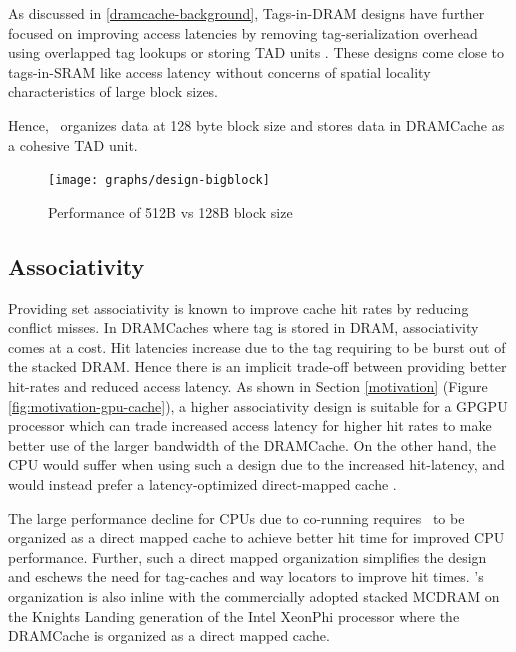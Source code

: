 \par As discussed in \ref{dramcache-background}, Tags-in-DRAM designs have further focused on improving access latencies by removing tag-serialization overhead using overlapped tag lookups \cite{loh-hill} or storing TAD units \cite{alloy}. These designs come close to tags-in-SRAM like access latency without concerns of spatial locality characteristics of large block sizes. 
\par Hence, \cachename\ organizes data at 128 byte block size and stores data in DRAMCache as a cohesive TAD unit.

\begin{figure}[htbp]
   \centering
   \texttt{[image: graphs/design-bigblock]}
   \caption{Performance of 512B vs 128B block size}	
   \label{fig:design-bigblock}
\end{figure}

\subsection{Associativity} 
Providing set associativity is known to improve cache hit rates by reducing conflict misses. In DRAMCaches where tag is stored in DRAM,  associativity comes at a cost. Hit latencies increase due to the tag requiring to be burst out of the stacked DRAM. Hence there is an implicit trade-off between providing better hit-rates and reduced access latency. As shown in Section \ref{motivation} (Figure \ref{fig:motivation-gpu-cache}), a higher associativity design is suitable for a GPGPU processor which can trade increased access latency for higher hit rates to make better use of the larger bandwidth of the DRAMCache. On the other hand, the CPU would suffer when using such a design due to the increased hit-latency, and  would instead prefer a latency-optimized direct-mapped cache \cite{alloy}.
\par The large performance decline for CPUs due to co-running requires \cachename\ to be organized as a direct mapped cache to achieve better hit time for improved CPU performance. Further, such a direct mapped organization simplifies the design and eschews the need for tag-caches \cite{atcache} and way locators \cite{bimodal} to improve hit times. \cachename's organization is also inline with the commercially adopted stacked MCDRAM on the Knights Landing generation of the Intel XeonPhi processor \cite{xeonphi} where the DRAMCache is organized as a direct mapped cache.

